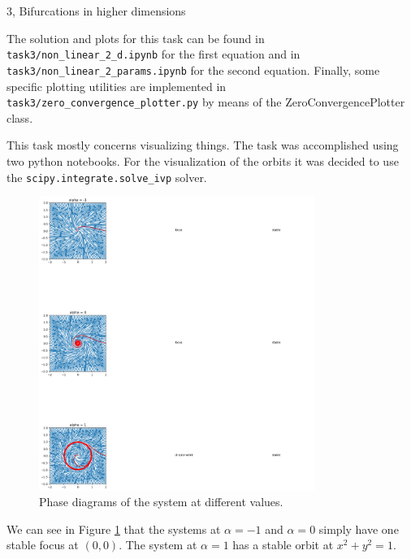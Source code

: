 \begin{task}{3, Bifurcations in higher dimensions}

The solution and plots for this task can be found in \verb|task3/non_linear_2_d.ipynb| for the first equation and in \verb|task3/non_linear_2_params.ipynb| for the second equation. Finally, some specific plotting utilities are implemented in \verb|task3/zero_convergence_plotter.py| by means of the ZeroConvergencePlotter class.

This task mostly concerns visualizing things. The task was accomplished using two python notebooks. For the visualization of the orbits it was decided to use the \verb|scipy.integrate.solve_ivp| solver.

\begin{figure}[H]
    \centering
    \includegraphics[width=0.8\textwidth]{images/bfdhopf.png}
    \caption{Phase diagrams of the system at different values.}
    \label{fig:bfdhopf}
\end{figure}

We can see in Figure \ref{fig:bfdhopf} that the systems at $\alpha = -1$ and $\alpha = 0$ simply have one stable focus at $(0,0)$. The system at $\alpha = 1$ has a stable orbit at $x^2+y^2 = 1$.


\end{task}
